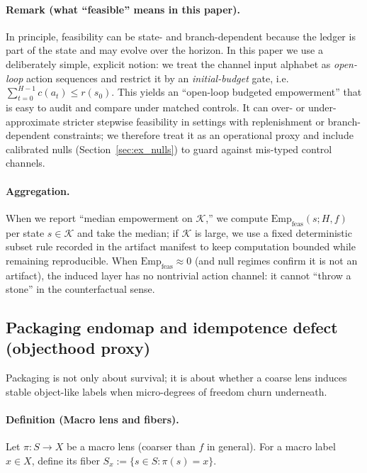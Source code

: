 \documentclass[11pt]{article}
\newcommand{\Emp}{\mathrm{Emp}}
\newcommand{\K}{\mathcal{K}}
\begin{document}
\paragraph{Remark (what ``feasible'' means in this paper).}
In principle, feasibility can be state- and branch-dependent because the ledger is part of the state and may evolve over the horizon. In this paper we use a deliberately simple, explicit notion: we treat the channel input alphabet as \emph{open-loop} action sequences and restrict it by an \emph{initial-budget} gate, i.e.\ $\sum_{t=0}^{H-1} c(a_t)\le r(s_0)$. This yields an ``open-loop budgeted empowerment'' that is easy to audit and compare under matched controls. It can over- or under-approximate stricter stepwise feasibility in settings with replenishment or branch-dependent constraints; we therefore treat it as an operational proxy and include calibrated nulls (Section~\ref{sec:ex_nulls}) to guard against mis-typed control channels.

\paragraph{Aggregation.}
When we report ``median empowerment on $\K$,'' we compute $\Emp_{\mathrm{feas}}(s;H,f)$ per state $s\in\K$ and take the median; if $\K$ is large, we use a fixed deterministic subset rule recorded in the artifact manifest to keep computation bounded while remaining reproducible.
When $\Emp_{\mathrm{feas}}\approx 0$ (and null regimes confirm it is not an artifact), the induced layer has no nontrivial action channel: it cannot ``throw a stone'' in the counterfactual sense.

\subsection{Packaging endomap and idempotence defect (objecthood proxy)}
Packaging is not only about survival; it is about whether a coarse lens induces stable object-like labels when micro-degrees of freedom churn underneath.

\paragraph{Definition (Macro lens and fibers).}
Let $\pi:S\to X$ be a macro lens (coarser than $f$ in general). For a macro label $x\in X$, define its fiber $S_x := \{s\in S : \pi(s)=x\}$.
\end{document}
